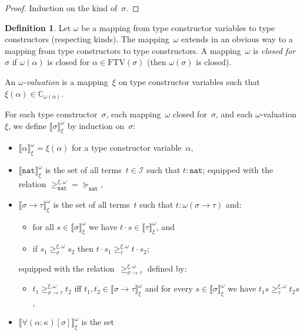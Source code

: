 \documentclass[a4paper,UKenglish,cleveref,autoref,numberwithinsect]{lipics-v2019}
\theoremstyle{definition}
\newtheorem{defn}[theorem]{Definition}
\newcommand{\Iterms}{\mathcal{I}}
\newcommand{\arrtype}{\rightarrow}
\newcommand{\app}[2]{#1 \cdot #2}
\newcommand{\nat}{\mathtt{nat}}
\newcommand{\FTV}{\mathrm{FTV}}
\newcommand{\Cb}{\mathbb{C}}
\newcommand{\val}[3]{\ensuremath{\llbracket#1\rrbracket_{#2}^{#3}}}
\newcommand{\gteq}[3]{\ensuremath{\ge_{#1}^{#2,#3}}}
\begin{document}
\begin{proof}
  Induction on the kind of~$\sigma$.
\end{proof}

\begin{defn}\label{def_wm_valuation}
  Let $\omega$ be a mapping from type constructor variables to type
  constructors (respecting kinds). The mapping~$\omega$ extends in an
  obvious way to a mapping from type constructors to type
  constructors. A mapping~$\omega$ is \emph{closed for~$\sigma$} if
  $\omega(\alpha)$ is closed for $\alpha \in \FTV(\sigma)$ (then
  $\omega(\sigma)$ is closed).

  An \emph{$\omega$-valuation} is a mapping~$\xi$ on type constructor
  variables such that $\xi(\alpha) \in \Cb_{\omega(\alpha)}$.

  For each type constructor~$\sigma$, each mapping~$\omega$ closed
  for~$\sigma$, and each $\omega$-valuation~$\xi$, we define
  $\val{\sigma}{\xi}{\omega}$ by induction on~$\sigma$:
  \begin{itemize}
  \item $\val{\alpha}{\xi}{\omega} = \xi(\alpha)$ for a type
    constructor variable~$\alpha$,
  \item $\val{\nat}{\xi}{\omega}$ is the set of all terms~$t \in
    \Iterms$ such that $t : \nat$; equipped with the relation
    $\gteq{\nat}{\xi}{\omega} = \succeq_\nat$,
  \item $\val{\sigma \arrtype \tau}{\xi}{\omega}$ is the set of all
    terms~$t$ such that $t : \omega(\sigma\arrtype\tau)$ and:
    \begin{itemize}
    \item for all $s \in \val{\sigma}{\xi}{\omega}$ we have
      $\app{t}{s} \in \val{\tau}{\xi}{\omega}$, and
    \item if $s_1 \gteq{\sigma}{\xi}{\omega} s_2$ then $\app{t}{s_1}
      \gteq{\tau}{\xi}{\omega} \app{t}{s_2}$;
    \end{itemize}
    equipped with the
    relation~$\gteq{\sigma\arrtype\tau}{\xi}{\omega}$ defined by:
    \begin{itemize}
    \item $t_1 \gteq{\sigma\arrtype\tau}{\xi}{\omega} t_2$ iff
      $t_1,t_2 \in \val{\sigma\arrtype\tau}{\xi}{\omega}$ and for
      every $s \in \val{\sigma}{\xi}{\omega}$ we have $t_1 s
      \gteq{\tau}{\xi}{\omega} t_2 s$,
    \end{itemize}
  \item $\val{\forall(\alpha:\kappa)[\sigma]}{\xi}{\omega}$ is the set

\end{itemize}
\end{defn}
\end{document}
